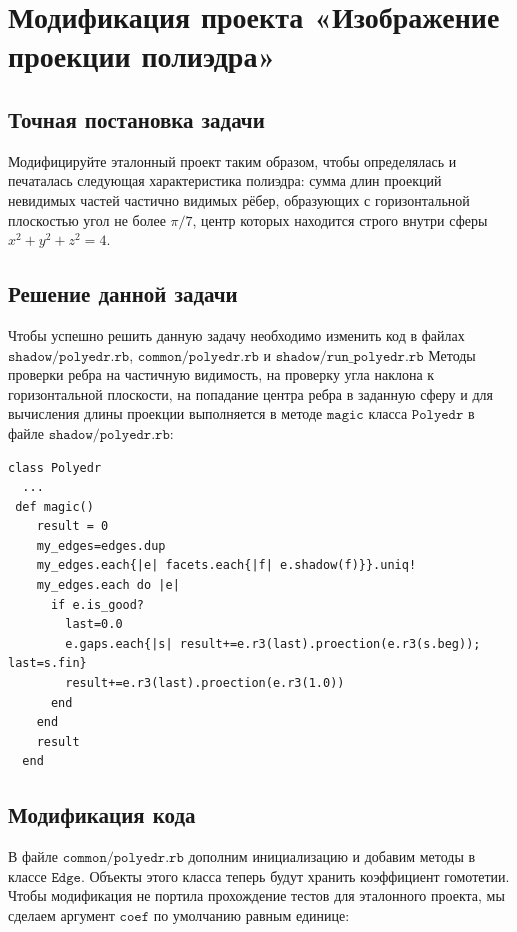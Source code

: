 \section{Модификация проекта «Изображение проекции полиэдра»}

\subsection*{Точная постановка задачи}
Модифицируйте эталонный проект таким образом, 
чтобы определялась и печаталась следующая характеристика полиэдра: 
сумма длин проекций невидимых частей частично видимых рёбер, образующих с горизонтальной плоскостью угол не более $\pi/7$, центр которых находится 
строго внутри сферы $x^2+y^2+z^2=4$.


\subsection*{Решение данной задачи}
Чтобы успешно решить данную задачу необходимо изменить код в файлах $\texttt{shadow/polyedr.rb}$, $\texttt{common/polyedr.rb}$ и $\texttt{shadow/run\_polyedr.rb}$
Методы проверки ребра на частичную видимость, на проверку угла наклона к горизонтальной плоскости, на попадание центра ребра в заданную 
сферу и для вычисления длины проекции выполняется в методе $\texttt{magic}$ класса $\texttt{Polyedr}$ в файле $\texttt{shadow/polyedr.rb}$:


\begin{small}
\begin{verbatim}
class Polyedr 
  ...
 def magic()
    result = 0
    my_edges=edges.dup
    my_edges.each{|e| facets.each{|f| e.shadow(f)}}.uniq!
    my_edges.each do |e|
      if e.is_good?
        last=0.0
        e.gaps.each{|s| result+=e.r3(last).proection(e.r3(s.beg)); last=s.fin}
        result+=e.r3(last).proection(e.r3(1.0))
      end
    end
    result
  end
\end{verbatim}
\end{small}

 \subsection*{Модификация кода}

В файле $\texttt{common/polyedr.rb}$ дополним инициализацию и добавим методы в классе 
$\texttt{Edge}$. Объекты этого класса теперь будут хранить коэффициент гомотетии. Чтобы модификация не портила прохождение тестов для эталонного проекта, мы сделаем аргумент $\texttt{coef}$ по умолчанию равным единице:


